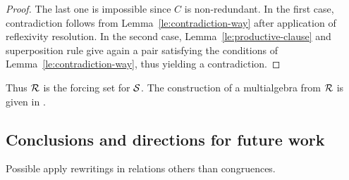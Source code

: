\begin{proof}
The last one is impossible since $C$ is non-redundant. In the first case,
contradiction follows from Lemma~\ref{le:contradiction-way} after
application of reflexivity resolution. In the second case, 
Lemma~\ref{le:productive-clause} and superposition rule give again a pair
satisfying the conditions of Lemma~\ref{le:contradiction-way}, thus yielding a
contradiction.
%
%
%
%
\end{proof}
\noindent
Thus $\mbox {$\cal R$}$ is the forcing set for $\mbox {$\cal S$}$.  The construction
of a multialgebra from $\mbox {$\cal R$}$ is given in \cite {KW}.

\subsection*{Conclusions and directions for future work}

Possible apply rewritings in relations others than congruences.

